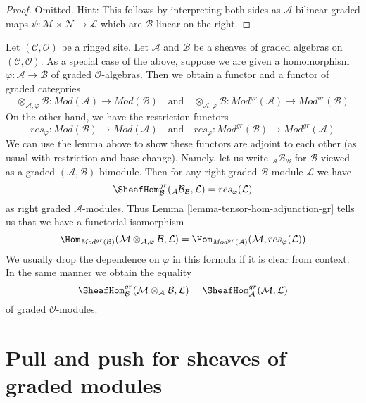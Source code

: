 \begin{proof}
Omitted. Hint: This follows by interpreting both sides as
$\mathcal{A}$-bilinear graded maps
$\psi : \mathcal{M} \times \mathcal{N} \to \mathcal{L}$
which are $\mathcal{B}$-linear on the right.
\end{proof}

\noindent
Let $(\mathcal{C}, \mathcal{O})$ be a ringed site. Let $\mathcal{A}$
and $\mathcal{B}$ be a sheaves of graded algebras on
$(\mathcal{C}, \mathcal{O})$.
As a special case of the above, suppose we are given
a homomorphism $\varphi : \mathcal{A} \to \mathcal{B}$
of graded $\mathcal{O}$-algebras. Then we obtain a functor
and a functor of graded categories
$$
\otimes_{\mathcal{A}, \varphi} \mathcal{B} :
\textit{Mod}(\mathcal{A})
\longrightarrow
\textit{Mod}(\mathcal{B})
\quad\text{and}\quad
\otimes_{\mathcal{A}, \varphi} \mathcal{B} :
\textit{Mod}^{gr}(\mathcal{A})
\longrightarrow
\textit{Mod}^{gr}(\mathcal{B})
$$
On the other hand, we have the restriction functors
$$
res_\varphi :
\textit{Mod}(\mathcal{B})
\longrightarrow
\textit{Mod}(\mathcal{A})
\quad\text{and}\quad
res_\varphi :
\textit{Mod}^{gr}(\mathcal{B})
\longrightarrow
\textit{Mod}^{gr}(\mathcal{A})
$$
We can use the lemma above to show these functors are adjoint to
each other (as usual with restriction and base change). Namely,
let us write ${}_\mathcal{A}\mathcal{B}_\mathcal{B}$ for
$\mathcal{B}$ viewed as a graded $(\mathcal{A}, \mathcal{B})$-bimodule.
Then for any right graded $\mathcal{B}$-module $\mathcal{L}$
we have
$$
\SheafHom_\mathcal{B}^{gr}({}_\mathcal{A}\mathcal{B}_\mathcal{B}, \mathcal{L})
= res_\varphi(\mathcal{L})
$$
as right graded $\mathcal{A}$-modules. Thus
Lemma \ref{lemma-tensor-hom-adjunction-gr}
tells us that we have a functorial isomorphism
$$
\Hom_{\textit{Mod}^{gr}(\mathcal{B})}(
\mathcal{M} \otimes_{\mathcal{A}, \varphi} \mathcal{B}, \mathcal{L}) =
\Hom_{\textit{Mod}^{gr}(\mathcal{A})}(
\mathcal{M}, res_\varphi(\mathcal{L}))
$$
We usually drop the dependence on $\varphi$ in this formula if it
is clear from context. In the same manner we obtain
the equality
$$
\SheafHom^{gr}_\mathcal{B}(
\mathcal{M} \otimes_\mathcal{A} \mathcal{B}, \mathcal{L}) =
\SheafHom_\mathcal{A}^{gr}(\mathcal{M}, \mathcal{L})
$$
of graded $\mathcal{O}$-modules.




\section{Pull and push for sheaves of graded modules}
\label{section-functoriality-graded}

